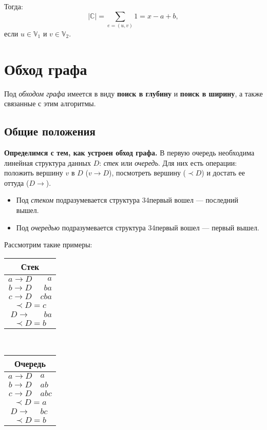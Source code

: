 \documentclass[russian]{lecture-notes}
\begin{document}
	Тогда:
	$$|\mathbb{C}| = \sum_{e = (u,v)} 1 = x - a + b,$$
	если $u \in \mathbb{V}_1$ и $v \in \mathbb{V}_2$.
	
	\section{Обход графа}
	Под \textit{обходом графа} имеется в виду \textbf{поиск в глубину} и \textbf{поиск в ширину}, а также связанные с этим алгоритмы.	
	\subsection{Общие положения}
	\textbf{Определимся с тем, как устроен обход графа.} В первую очередь необходима линейная структура данных $D$: \textit{стек} или \textit{очередь}. Для них есть операции: положить вершину $v$ в $D$ ($v \rightarrow D$), посмотреть вершину ($\prec D$) и достать ее оттуда ($D \rightarrow$).
	\begin{itemize}
		\item Под \textit{стеком} подразумевается структура \char34первый вошел --- последний вышел.
		\item Под \textit{очередью} подразумевается структура \char34первый вошел --- первый вышел.
	\end{itemize}
	\begin{example}
		Рассмотрим такие примеры:
		\begin{center}
			\begin{tabular}{c|r}
				\multicolumn{2}{c}{Стек}\\
				\hline
				$a \rightarrow D$&$a$\\
				$b \rightarrow D$&$ba$\\
				$c \rightarrow D$&$cba$\\
				\multicolumn{2}{c}{$\prec D = c$}\\
				$D \rightarrow$&$ba$\\
				\multicolumn{2}{c}{$\prec D = b$}\\
			\end{tabular}
			~~~~~~~~~~~~
			\begin{tabular}{c|l}
				\multicolumn{2}{c}{Очередь}\\
				\hline
				$a \rightarrow D$&$a$\\
				$b \rightarrow D$&$ab$\\
				$c \rightarrow D$&$abc$\\
				\multicolumn{2}{c}{$\prec D = a$}\\
				$D \rightarrow$&$bc$\\
				\multicolumn{2}{c}{$\prec D = b$}\\
			\end{tabular}
		\end{center}
	\end{example}
	
\end{document}
